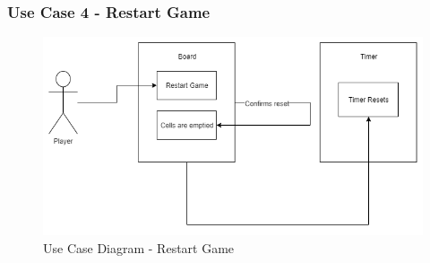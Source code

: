 \documentclass[12pt]{article}
\begin{document}
\newpage


\subsubsection{Use Case 4 - Restart Game} \label{uc:4}

\begin{figure}[htbp]
    \centering
    \includegraphics[scale=0.6]{RestartGame}
    \caption{Use Case Diagram - Restart Game}
    \label{fig:RestartGame}
\end{figure}
\end{document}
